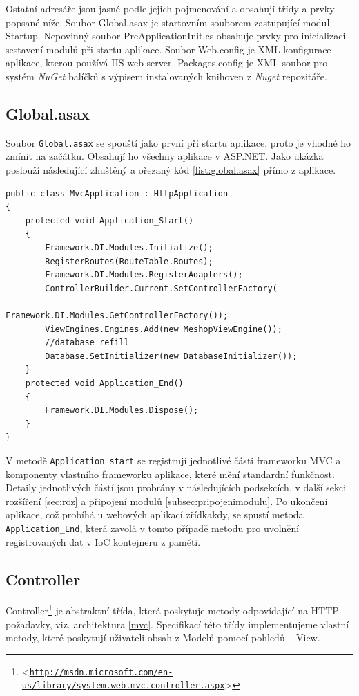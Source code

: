 \documentclass[11pt,twoside,a4paper]{book}
\let\oldUrl\url
\renewcommand\url[1]{<\texttt{\oldUrl{#1}}>}
\begin{document}
Ostatní adresáře jsou jasné podle jejich pojmenování a obsahují třídy a prvky popsané níže. Soubor \textsf{Global.asax} je startovním souborem zastupující modul \textsf{Startup}. Nepovinný soubor \textsf{PreApplicationInit.cs} obsahuje prvky pro inicializaci sestavení modulů při startu aplikace. Soubor \textsf{Web.config} je XML konfigurace aplikace, kterou používá IIS web server. \textsf{Packages.config} je XML soubor pro systém \textit{NuGet} balíčků s výpisem instalovaných knihoven z \textit{Nuget} repozitáře.


\subsection{Global.asax}
Soubor \texttt{Global.asax} se spouští jako první při startu aplikace, proto je vhodné ho zmínit na začátku. Obsahují ho všechny aplikace v ASP.NET. Jako ukázka poslouží následující zhuštěný a ořezaný kód \ref{list:global.asax} přímo z aplikace. 

\begin{lstlisting}[float=h!,language=CSharp, caption={Global.asax}, label=list:global.asax]
public class MvcApplication : HttpApplication
{
    protected void Application_Start()
    {
        Framework.DI.Modules.Initialize();
        RegisterRoutes(RouteTable.Routes);          
        Framework.DI.Modules.RegisterAdapters();
        ControllerBuilder.Current.SetControllerFactory(
        						Framework.DI.Modules.GetControllerFactory());
        ViewEngines.Engines.Add(new MeshopViewEngine());
        //database refill
        Database.SetInitializer(new DatabaseInitializer()); 
    }
    protected void Application_End()
    {
        Framework.DI.Modules.Dispose();
    }
}
\end{lstlisting}

V metodě \texttt{Application\_start} se registrují jednotlivé části frameworku MVC a komponenty vlastního frameworku aplikace, které mění standardní funkčnost. Detaily jednotlivých částí jsou probrány v následujících podsekcích, v další sekci rozšíření \ref{sec:roz} a připojení modulů \ref{subsec:pripojenimodulu}. Po ukončení aplikace, což probíhá u webových aplikací zřídkakdy, se spustí metoda \texttt{Application\_End}, která zavolá v tomto případě metodu pro uvolnění registrovaných dat v IoC kontejneru z paměti.


\subsection{Controller}
Controller\footnote{\url{http://msdn.microsoft.com/en-us/library/system.web.mvc.controller.aspx}} je abstraktní třída, která poskytuje metody odpovídající na HTTP požadavky, viz. architektura \ref{mvc}. Specifikací této třídy implementujeme vlastní metody, které poskytují uživateli obsah z \textsf{Model}ů  pomocí pohledů -- \textsf{View}. 
\end{document}
